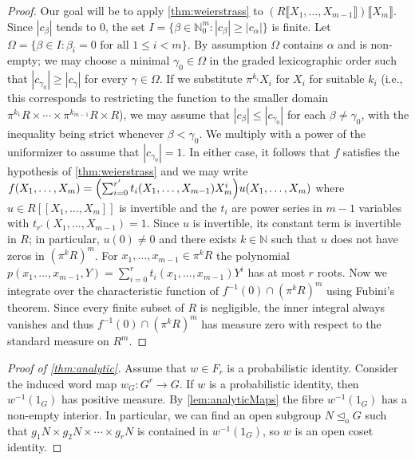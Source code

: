 \documentclass[a4paper,10pt]{amsart}
\theoremstyle{plain}
\theoremstyle{definition}
\newcommand{\bbN}{\mathbb{N}}
\numberwithin{equation}{section}
\begin{document}
\begin{proof}
Our goal will be to apply \cref{thm:weierstrass} to $(R\llbracket X_1,\ldots,X_{m-1} \rrbracket)\llbracket X_m \rrbracket$. Since $|c_\beta|$ tends to $0$, the set $I =\{\beta \in \bbN_0^m : |c_\beta| \geq |c_\alpha| \}$ is finite. Let $\Omega = \{\beta \in I : \beta_i = 0 \text{ for all }1\leq i < m \}$. By assumption $\Omega$ contains $\alpha$ and is non-empty; we may choose a minimal $\gamma_0 \in \Omega$ in the graded lexicographic order such that $|c_{\gamma_0}| \geq |c_\gamma|$ for every $\gamma \in \Omega$. If we substitute $\pi^{k_i}X_i$ for $X_i$ for suitable $k_i$ (i.e., this corresponds to restricting the function to the smaller domain $\pi^{k_1}R \times \cdots \times \pi^{k_{m-1}} R\times R$), we may assume that $|c_\beta| \leq |c_{\gamma_0}|$ for each $\beta \neq \gamma_0$, with the inequality being strict whenever $\beta < \gamma_0$. We multiply with a power of the uniformizer to assume that $|c_{\gamma_0}| = 1$. In either case, it follows that $f$ satisfies the hypothesis of \cref{thm:weierstrass} and we may write $f(X_1,\dots,X_m)= \Bigl(\sum_{i=0}^{r'} t_i(X_1,\dots,X_{m-1})X_m^{i}\Bigr) u(X_1,\dots,X_m)$
where $u \in R[\![X_1,\dots,X_m]\!]$ is invertible and the $t_i$ are power series in $m-1$ variables
with $t_{r'}(X_1,\dots,X_{m-1}) = 1$.
Since $u$ is invertible, its constant term is invertible in $R$; in particular, $u(0)\not=0$ and there exists $k\in{\mathbb N}$ such that $u$ does not have zeros in $(\pi^k R)^m$. For
$x_1,\ldots,x_{m-1}\in\pi^k R$ the polynomial $p(x_1,\dots,x_{m-1},Y) = \sum_{i=0}^r t_i(x_1,\dots,x_{m-1})Y^{i}$ has at most 
$r$ roots.
Now we integrate over the characteristic function of $f^{-1}(0)\cap (\pi^k R)^m$ using Fubini's theorem. Since every finite subset of $R$ is negligible, the inner integral always vanishes and thus $f^{-1}(0) \cap (\pi^k R)^m$ has measure zero with respect to the standard measure on $R^m$.
\end{proof}

\begin{proof}[Proof of \cref{thm:analytic}]
Assume that $w \in F_r$ is a probabilistic identity. Consider the induced word map $w_G \colon G^r \to G$. If $w$ is a probabilistic identity, then $w^{-1}(1_G)$ has positive measure. By \cref{lem:analyticMaps} the fibre $w^{-1}(1_G)$ has a non-empty interior. In particular, we can find an open subgroup $N \trianglelefteq_{\mathrm{o}} G$ such that $g_1N \times g_2N \times \cdots \times g_rN$
is contained in $w^{-1}(1_G)$, so $w$ is an open coset identity.
\end{proof}
\end{document}

